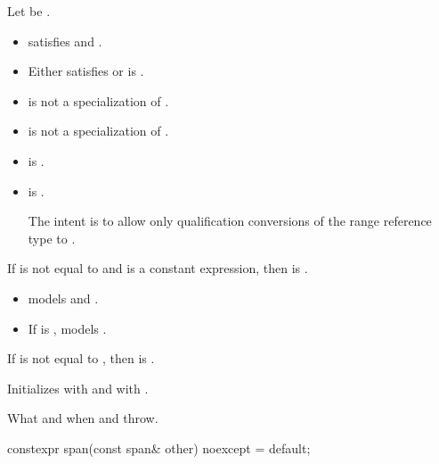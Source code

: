 \begin{itemdescr}
\pnum
\constraints
Let  be .
\begin{itemize}
\item {} satisfies  and
  .
\item Either  satisfies  or
 is .
\item {} is not a specialization of .
\item {} is not a specialization of .
\item {} is .
\item
{} is .
\begin{note}
The intent is to allow only qualification conversions
of the range reference type to .
\end{note}
\end{itemize}

\pnum
\mandates
If  is not equal to  and
 is a constant expression, then
 is .

\pnum
\expects
\begin{itemize}
\item {} models  and
.
\item If  is ,
 models .
\end{itemize}

\pnum
\hardexpects
If  is not equal to ,
then  is .

\pnum
\effects
Initializes  with  and
 with .

\pnum
\throws
What and when  and  throw.
\end{itemdescr}

%
\begin{itemdecl}
constexpr span(const span& other) noexcept = default;
\end{itemdecl}

